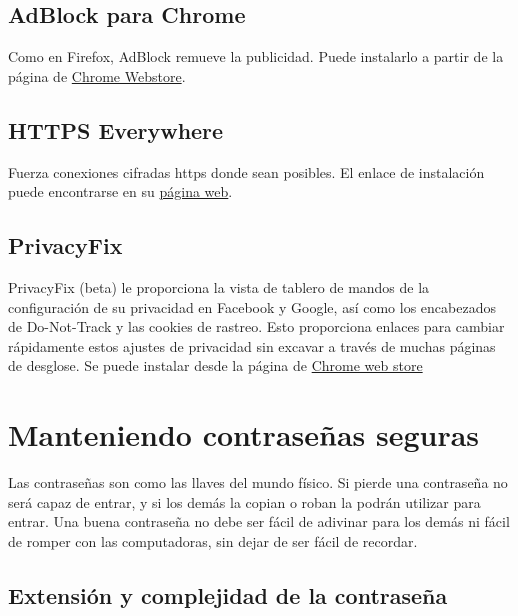 \documentclass[10pt,a5paper,twoside,,]{book}
\begin{document}
\section{AdBlock para Chrome}\label{adblock-para-chrome}

Como en Firefox, AdBlock remueve la publicidad. Puede instalarlo a
partir de la página de
\href{https://chrome.google.com/webstore/detail/adblock/gighmmpiobklfepjocnamgkkbiglidom}{Chrome
Webstore}.

\section{HTTPS Everywhere}\label{https-everywhere-1}

Fuerza conexiones cifradas https donde sean posibles. El enlace de
instalación puede encontrarse en su
\href{https://www.eff.org/https-everywhere}{página web}.

\section{PrivacyFix}\label{privacyfix}

PrivacyFix (beta) le proporciona la vista de tablero de mandos de la
configuración de su privacidad en Facebook y Google, así como los
encabezados de Do-Not-Track y las cookies de rastreo. Esto proporciona
enlaces para cambiar rápidamente estos ajustes de privacidad sin excavar
a través de muchas páginas de desglose. Se puede instalar desde la
página de
\href{https://chrome.google.com/webstore/detail/privacyfix-by-privacychoi/pmejhjjecaldkllonlokhkglbdbkdcni}{Chrome
web store}

\chapter{Manteniendo contraseñas
seguras}\label{manteniendo-contraseuxf1as-seguras}

Las contraseñas son como las llaves del mundo físico. Si pierde una
contraseña no será capaz de entrar, y si los demás la copian o roban la
podrán utilizar para entrar. Una buena contraseña no debe ser fácil de
adivinar para los demás ni fácil de romper con las computadoras, sin
dejar de ser fácil de recordar.

\section{Extensión y complejidad de la
contraseña}\label{extensiuxf3n-y-complejidad-de-la-contraseuxf1a}
\end{document}

